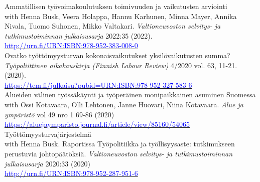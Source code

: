 \documentclass[16pt]{article}
\begin{document}
\noindent Ammatillisen ty\"{o}voimakoulutuksen toimivuuden ja vaikutusten arviointi \\
\noindent with Henna Busk, Veera Holappa, Hannu Karhunen, Minna Mayer, Annika Nivala, Tuomo Suhonen, Mikko Valtakari.  \textit{Valtioneuvoston selvitys- ja tutkimustoiminnan julkaisusarja} 2022:35 (2022).  \\
\noindent \href{http://urn.fi/URN:ISBN:978-952-383-008-0}{\textcolor{blue}{http://urn.fi/URN:ISBN:978-952-383-008-0}} \\

\noindent Ovatko ty\"{o}tt\"{o}myysturvan kokonaisvaikutukset yksil\"{o}vaikutusten summa? \\
\noindent  \textit{Ty\"{o}poliittinen aikakauskirja (Finnish Labour Review)} 4/2020 vol. 63, 11-21.  (2020). \\
\noindent  \href{https://tem.fi/julkaisu?pubid=URN:ISBN:978-952-327-583-6} {\textcolor{blue}{https://tem.fi/julkaisu?pubid=URN:ISBN:978-952-327-583-6}}\\

\noindent Alueiden v\"{a}linen ty\"{o}ss\"{a}k\"{a}ynti ja ty\"{o}per\"{a}inen monipaikkainen asuminen Suomessa \\
\noindent with Ossi Kotavaara, Olli Lehtonen, Janne Huovari, Niina Kotavaara. \textit{Alue ja ympäristö} vol 49 nro 1 69-86 (2020) \\
\noindent  \href{https://aluejaymparisto.journal.fi/article/view/85160/54065}{\textcolor{blue}{https://aluejaymparisto.journal.fi/article/view/85160/54065}} \\
 
\noindent Ty\"{o}tt\"{o}myysturvaj\"{a}rjestelm\"{a} \\
\noindent with Henna Busk. Raportissa Ty\"{o}politiikka ja ty\"{o}llisyysaste: tutkimukseen perustuvia johtop\"{a}\"{a}t\"{o}ksi\"{a}. \textit{Valtioneuvoston selvitys- ja tutkimustoiminnan julkaisusarja} 2020:33 (2020) \\
\noindent  \href{http://urn.fi/URN:ISBN:978-952-287-951-6}{\textcolor{blue}{http://urn.fi/URN:ISBN:978-952-287-951-6}} \\
\end{document}
